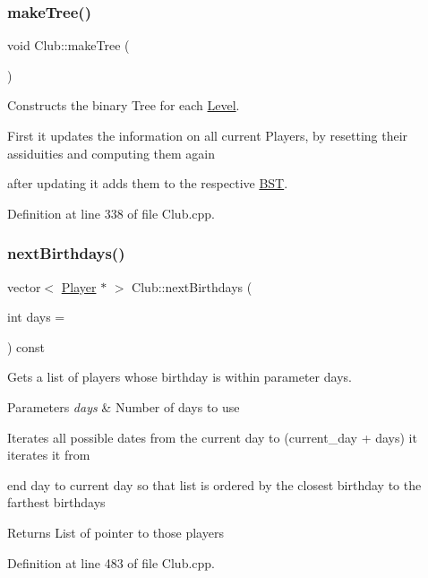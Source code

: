 \subsubsection{\texorpdfstring{make\+Tree()}{makeTree()}}
{\footnotesize\ttfamily void Club\+::make\+Tree (\begin{DoxyParamCaption}{ }\end{DoxyParamCaption})}



Constructs the binary Tree for each \hyperlink{class_level}{Level}. 

First it updates the information on all current Players, by resetting their assiduities and computing them again

after updating it adds them to the respective \hyperlink{class_b_s_t}{B\+ST}. 

Definition at line 338 of file Club.\+cpp.

\hypertarget{class_club_a63871ced4b025d0a3ab488c9a47a4d07}{}\label{class_club_a63871ced4b025d0a3ab488c9a47a4d07} 
\subsubsection{\texorpdfstring{next\+Birthdays()}{nextBirthdays()}}
{\footnotesize\ttfamily vector$<$ \hyperlink{class_player}{Player} $\ast$ $>$ Club\+::next\+Birthdays (\begin{DoxyParamCaption}\item[{int}]{days = {} }\end{DoxyParamCaption}) const}



Gets a list of players whose birthday is within parameter days. 


\begin{DoxyParams}{Parameters}
{\em days} & Number of days to use\\
\hline
\end{DoxyParams}
Iterates all possible dates from the current day to (current\+\_\+day + days) it iterates it from

end day to current day so that list is ordered by the closest birthday to the farthest birthdays \begin{DoxyReturn}{Returns}
List of pointer to those players 
\end{DoxyReturn}


Definition at line 483 of file Club.\+cpp.

